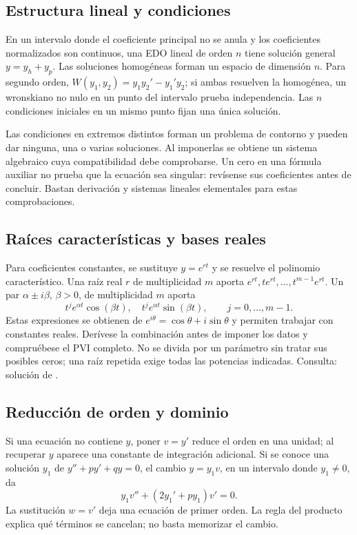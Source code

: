 %
\subsection*{Estructura lineal y condiciones}
\label{CH04-B01}
En un intervalo donde el coeficiente principal no se anula y los
coeficientes normalizados son continuos, una EDO lineal de orden $n$
tiene solución general $y=y_h+y_p$. Las soluciones homogéneas forman un
espacio de dimensión $n$. Para segundo orden,
$W(y_1,y_2)=y_1y_2'-y_1'y_2$; si ambas resuelven la homogénea, un
wronskiano no nulo en un punto del intervalo prueba independencia.
Las $n$ condiciones iniciales en un mismo punto fijan una única solución.

Las condiciones en extremos distintos forman un problema de contorno y
pueden dar ninguna, una o varias soluciones. Al imponerlas se obtiene un
sistema algebraico cuya compatibilidad debe comprobarse. Un cero en una
fórmula auxiliar no prueba que la ecuación sea singular: revísense sus
coeficientes antes de concluir. Bastan derivación y sistemas lineales
elementales para estas comprobaciones.

%
\subsection*{Raíces características y bases reales}
\label{CH04-B02}
Para coeficientes constantes, se sustituye $y=e^{rt}$ y se resuelve el
polinomio característico. Una raíz real $r$ de multiplicidad $m$ aporta
$e^{rt},te^{rt},\ldots,t^{m-1}e^{rt}$. Un par
$\alpha\pm i\beta$, $\beta>0$, de multiplicidad $m$ aporta
\[
 t^j e^{\alpha t}\cos(\beta t),\quad
 t^j e^{\alpha t}\sin(\beta t),\qquad j=0,\ldots,m-1.
\]
Estas expresiones se obtienen de
$e^{i\theta}=\cos\theta+i\sin\theta$ y permiten trabajar con constantes
reales. Derívese la combinación antes de imponer los datos y compruébese
el PVI completo. No se divida por un parámetro sin tratar sus posibles
ceros; una raíz repetida exige todas las potencias indicadas.
Consulta: solución de .

%
\subsection*{Reducción de orden y dominio}
\label{CH04-B03}
Si una ecuación no contiene $y$, poner $v=y'$ reduce el orden en una
unidad; al recuperar $y$ aparece una constante de integración adicional.
Si se conoce una solución $y_1$ de
$y''+p y'+q y=0$, el cambio $y=y_1v$, en un intervalo donde $y_1\ne0$,
da
\[
 y_1v''+(2y_1'+p y_1)v'=0.
\]
La sustitución $w=v'$ deja una ecuación de primer orden. La regla del
producto explica qué términos se cancelan; no basta memorizar el cambio.


